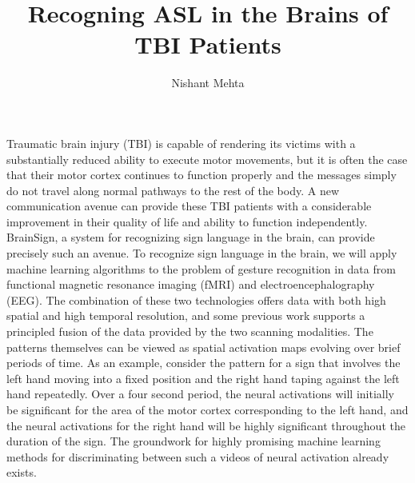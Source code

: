 \documentclass{article}
\author{Nishant Mehta}
\title{Recogning ASL in the Brains of TBI Patients}
\begin{document}
\maketitle

Traumatic brain injury (TBI) is capable of rendering its victims with a substantially reduced ability to execute motor movements, but it is often the case that their motor cortex continues to function properly and the messages simply do not travel along normal pathways to the rest of the body. A new communication avenue can provide these TBI patients with a considerable improvement in their quality of life and ability to function independently. BrainSign, a system for recognizing sign language in the brain, can provide precisely such an avenue. To recognize sign language in the brain, we will apply machine learning algorithms to the problem of gesture recognition in data from functional magnetic resonance imaging (fMRI) and electroencephalography (EEG). The combination of these two technologies offers data with both high spatial and high temporal resolution, and some previous work supports a principled fusion of the data provided by the two scanning modalities. The patterns themselves can be viewed as spatial activation maps evolving over brief periods of time. As an example, consider the pattern for a sign that involves the left hand moving into a fixed position and the right hand taping against the left hand repeatedly. Over a four second period, the neural activations will initially be significant for the area of the motor cortex corresponding to the left hand, and the neural activations for the right hand will be highly significant throughout the duration of the sign. The groundwork for highly promising machine learning methods for discriminating between such a videos of neural activation already exists.
\end{document}
